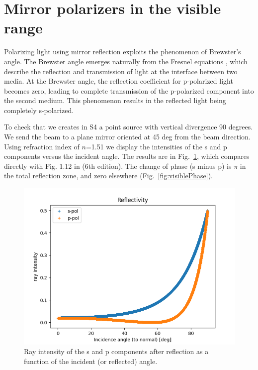 \documentclass{iucr}
\begin{document}
\section{Mirror polarizers in the visible range}\label{sec:mirror}

Polarizing light using mirror reflection exploits the phenomenon of Brewster's angle. The Brewster angle emerges naturally from the Fresnel equations \cite{born_wolf}, which describe the reflection and transmission of light at the interface between two media. At the Brewster angle, the reflection coefficient for p-polarized light becomes zero, leading to complete transmission of the p-polarized component into the second medium. This phenomenon results in the reflected light being completely s-polarized.

To check that we creates in S4 a point source with vertical divergence 90 degrees. We send the beam to a plane mirror oriented at 45 deg from the beam direction. Using refraction index of $n$=1.51 we display the intensities of the s and p components versus the incident angle. The results are in Fig.~\ref{fig:visibleR}, which compares directly with Fig. 1.12 in \cite{born_wolf} (6th edition). The change of phase (s minus p) is $\pi$ in the total reflection zone, and zero elsewhere (Fig.~\ref{fig:visiblePhase}).

\begin{figure}\label{fig:visibleR}
\centering
\includegraphics[width=0.95\linewidth]{figures/visibleR.png}
\caption{Ray intensity of the s and p components after reflection as a function of the incident (or reflected) angle.}
\end{figure}
\end{document}
